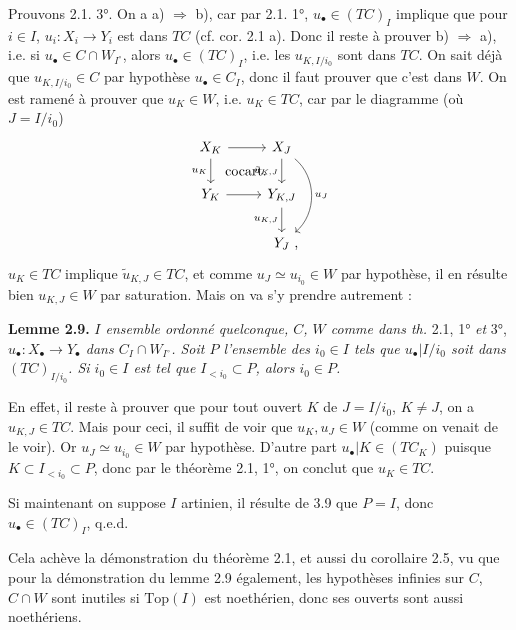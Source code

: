 
Prouvons 2.1. 3°. On a a) $\Longrightarrow$ b), car par 2.1. 1°, $u_\bullet \in (TC)_I$ implique que pour $i \in I$, $u_i : X_i \longrightarrow Y_i$ est dans $TC$ (cf. cor. 2.1 a). Donc il reste à prouver b) $\Longrightarrow$ a), i.e. si $u_\bullet \in C \cap W_{I^\circ}$, alors $u_\bullet \in (TC)_I$, i.e. les $u_{K,I/i_0}$ sont dans $TC$. On sait déjà que $u_{K,I/i_0} \in C$ par hypothèse $u_\bullet \in C_I$, donc il faut prouver que c'est dans $W$. On est ramené à prouver que $u_K \in W$, i.e. $u_K \in TC$, car par le diagramme (où $J = I/i_0$)
\[
\begin{tikzcd}
X_K \arrow[r] \arrow[d, "u_K"'] \arrow[dr, phantom, "\text{cocart.}"] & X_J \arrow[d, "\tilde{u}_{K,J}"'] \arrow[dd, bend left=50, "u_J"] \\
Y_K \arrow[r] & Y_{K,J} \arrow[d, "u_{K,J}"'] \\
& Y_J \rlap{\ ,}
\end{tikzcd}
\]
$u_K \in TC$ implique $\tilde{u}_{K,J} \in TC$, et comme $u_J \simeq u_{i_0} \in W$ par hypothèse, il en résulte bien $u_{K,J} \in W$ par saturation. Mais on va s'y prendre autrement :


\noindent\textbf{Lemme 2.9.} \textit{$I$ ensemble ordonné quelconque, $C$, $W$ comme dans th.} 2.1, 1° \textit{et} 3°, \textit{$u_\bullet : X_\bullet \longrightarrow Y_\bullet$ dans $C_I \cap W_{I^\circ}$. Soit $P$ l'ensemble des $i_0 \in I$ tels que $u_\bullet|I/i_0$ soit dans $(TC)_{I/i_0}$. Si $i_0 \in I$ est tel que $I_{<i_0} \subset P$, alors $i_0 \in P$.}

En effet, il reste à prouver que pour tout ouvert $K$ de $J = I/i_0$, $K \neq J$, on a $u_{K,J} \in TC$. Mais pour ceci, il suffit de voir que $u_K, u_J \in W$ (comme on venait de le voir). Or $u_J \simeq u_{i_0} \in W$ par hypothèse. D'autre part $u_\bullet|K \in (TC_K)$ puisque $K \subset I_{<i_0} \subset P$, donc par le théorème 2.1, 1°, on conclut que $u_K \in TC$.

Si maintenant on suppose $I$ artinien, il résulte de 3.9 que $P = I$, donc $u_\bullet \in (TC)_I$, q.e.d. %

Cela achève la démonstration du théorème 2.1, et aussi du corollaire 2.5, vu que pour la démonstration du lemme 2.9 également, les hypothèses infinies sur $C$, $C \cap W$ sont inutiles si $\mathrm{Top}(I)$ est noethérien, donc ses ouverts sont aussi noethériens.

